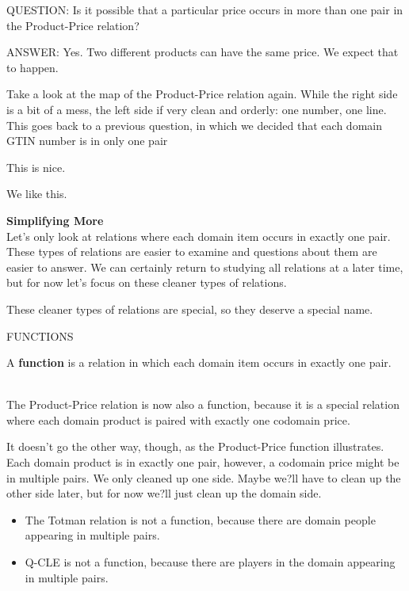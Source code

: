 \documentclass{ximera}
\begin{document}
\begin{dialogue}
\item[QUESTION:] Is it possible that a particular price occurs in more than one pair in the Product-Price relation? \\
\item[ANSWER:] Yes. Two different products can have the same price.  We expect that to happen. \\
\end{dialogue}


Take a look at the map of the Product-Price relation again.  While the right side is a bit of a mess, the left side if very clean and orderly: one number, one line.  This goes back to a previous question, in which we decided that each domain GTIN number is in only one pair



This is nice. 


We like this.

\textbf{Simplifying More} \\
Let's only look at relations where each domain item occurs in exactly one pair. These types of relations are easier to examine and questions about them are easier to answer.  We can certainly return to studying all relations at a later time, but for now let's focus on these cleaner types of relations.  

These cleaner types of relations are special, so they deserve a special name.


\begin{center}
FUNCTIONS
\end{center}

\begin{definition}
A \textbf{function} is a relation in which each domain item occurs in exactly one pair.
\end{definition}

\quad \\

The Product-Price relation is now also a function, because it is a special relation where each domain product is paired with exactly one codomain price.

It doesn't go the other way, though, as the Product-Price function illustrates. Each domain product is in exactly one pair, however, a codomain price might be in multiple pairs.  We only cleaned up one side.  Maybe we?ll have to clean up the other side later, but for now we?ll just clean up the domain side.

\begin{itemize}
\item The Totman relation is not a function, because there are domain people appearing in multiple pairs.
\item Q-CLE is not a function, because there are players in the domain appearing in multiple pairs.
\end{itemize}
\end{document}
